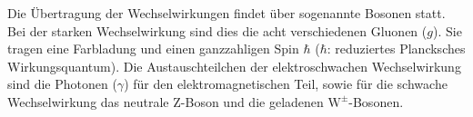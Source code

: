 Die Übertragung der Wechselwirkungen findet über sogenannte Bosonen statt. Bei der starken Wechselwirkung sind dies die acht verschiedenen Gluonen ($g$). Sie tragen eine Farbladung und einen ganzzahligen Spin $\hbar$ ($\hbar$: reduziertes Plancksches Wirkungsquantum). Die Austauschteilchen der elektroschwachen Wechselwirkung sind die Photonen ($\gamma$) für den elektromagnetischen Teil, sowie für die schwache Wechselwirkung das neutrale $\mathrm{Z}$-Boson und die geladenen $\mathrm{W^{\pm}}$-Bosonen.
